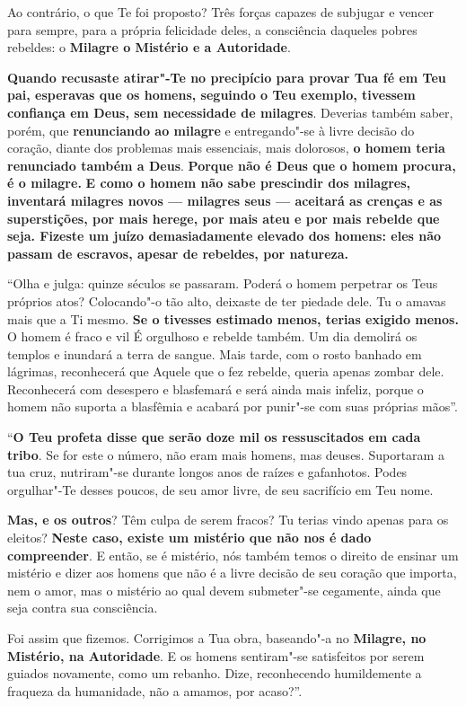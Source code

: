 Ao contrário, o que Te foi proposto? Três forças capazes de subjugar e
vencer para sempre, para a própria felicidade deles, a consciência
daqueles pobres rebeldes: o \textbf{Milagre o Mistério e a Autoridade}.

\textbf{Quando recusaste atirar"-Te no precipício para provar Tua fé em
Teu pai, esperavas que os homens, seguindo o Teu exemplo, tivessem
confiança em Deus, sem necessidade de milagres}. Deverias também saber,
porém, que \textbf{renunciando ao milagre} e entregando"-se à livre
decisão do coração, diante dos problemas mais essenciais, mais
dolorosos, \textbf{o homem teria renunciado também a Deus}.
\textbf{Porque não é Deus que o homem procura, é o milagre.} \textbf{E
como o homem não sabe prescindir dos milagres, inventará milagres novos
--- milagres seus --- aceitará as crenças e as superstições, por mais
herege, por mais ateu e por mais rebelde que seja. Fizeste um juízo
demasiadamente elevado dos homens: eles não passam de escravos, apesar
de rebeldes, por natureza.}

``Olha e julga: quinze séculos se passaram. Poderá o homem perpetrar os
Teus próprios atos? Colocando"-o tão alto, deixaste de ter piedade dele.
Tu o amavas mais que a Ti mesmo. \textbf{Se o tivesses estimado menos,
terias exigido menos.} O homem é fraco e vil É orgulhoso e rebelde
também. Um dia demolirá os templos e inundará a terra de sangue. Mais
tarde, com o rosto banhado em lágrimas, reconhecerá que Aquele que o fez
rebelde, queria apenas zombar dele. Reconhecerá com desespero e
blasfemará e será ainda mais infeliz, porque o homem não suporta a
blasfêmia e acabará por punir"-se com suas próprias mãos''.

``\textbf{O Teu profeta disse que serão doze mil os ressuscitados em
cada tribo}. Se for este o número, não eram mais homens, mas deuses.
Suportaram a tua cruz, nutriram"-se durante longos anos de raízes e
gafanhotos. Podes orgulhar"-Te desses poucos, de seu amor livre, de seu
sacrifício em Teu nome.

\textbf{Mas, e os outros}? Têm culpa de serem fracos? Tu terias vindo
apenas para os eleitos? \textbf{Neste caso, existe um mistério que não
nos é dado compreender}. E então, se é mistério, nós também temos o
direito de ensinar um mistério e dizer aos homens que não é a livre
decisão de seu coração que importa, nem o amor, mas o mistério ao qual
devem submeter"-se cegamente, ainda que seja contra sua consciência.

Foi assim que fizemos. Corrigimos a Tua obra, baseando"-a no
\textbf{Milagre, no} \textbf{Mistério, na Autoridade}. E os homens
sentiram"-se satisfeitos por serem guiados novamente, como um rebanho.
Dize, reconhecendo humildemente a fraqueza da humanidade, não a amamos,
por acaso?''.

